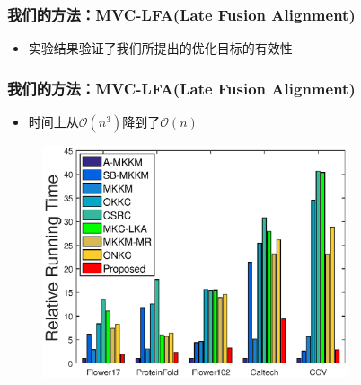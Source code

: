 \begin{frame}
    \frametitle{我们的方法：MVC-LFA(Late Fusion Alignment)}
    \begin{itemize}
        \item 实验结果验证了我们所提出的优化目标的有效性
\begin{figure}[!ht]
\vspace{-15pt}
\begin{center}
{
\centering
{}%
%
\vspace{-11pt}
\caption{}
}
\end{center}
\end{figure}
    \end{itemize} 
        
\end{frame}

\begin{frame}
    \frametitle{我们的方法：MVC-LFA(Late Fusion Alignment)}
    \begin{itemize}
        \item 时间上从$\mathcal{O}(n^3)$降到了$\mathcal{O}(n)$
    \end{itemize} 
    \begin{figure}
        \includegraphics[width=0.8\textwidth]{figures/timepictures.eps} 
    \end{figure}          
\end{frame}
